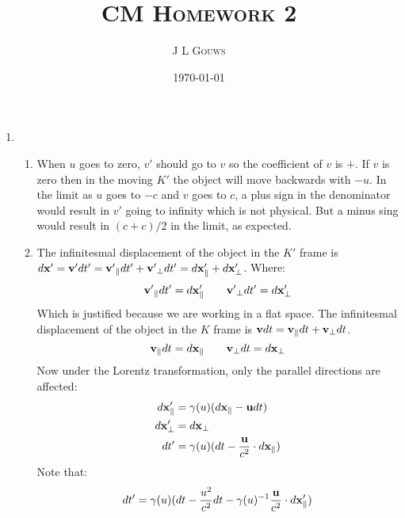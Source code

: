 \documentclass[12pt,a4]{article}
\title{
\textsc{CM Homework 2}
}
\author{\textsc{J L Gouws}
}
\date{\today
\\[1cm]}
\begin{document}
\thispagestyle{empty}

\maketitle

\begin{enumerate}
  \item
    \begin{enumerate}
      \item 
        When $u$ goes to zero, $v'$ should go to $v$ so the coefficient of $v$ is $+$.
        If $v$ is zero then in the moving $K'$ the object will move backwards with $-u$.
        In the limit as $u$ goes to $-c$ and $v$ goes to $c$, a plus sign in the denominator would result in $v'$ going to infinity which is not physical.
        But a minus sing would result in $(c + c) / 2$ in the limit, as expected.
      \item
        The infinitesmal displacement of the object in the $K'$ frame is $d{\bf x'} = {\bf v'}dt' = {\bf v'}_{\parallel} dt' + {\bf v'}_{\perp}dt' = d {\bf x}'_\parallel + d {\bf x}'_\perp$. Where:
        \begin{equation*}
          {\bf v'}_{\parallel} dt' = d {\bf x}'_\parallel \qquad {\bf v'}_{\perp}dt' = d {\bf x}'_\perp
        \end{equation*}
        Which is justified because we are working in a flat space.
        The infinitesmal displacement of the object in the $K$ frame is ${\bf v}dt = {\bf v}_{\parallel} dt + {\bf v}_{\perp}dt$.
        \begin{equation*}
          {\bf v}_{\parallel} dt = d {\bf x}_\parallel \qquad {\bf v}_{\perp}dt = d {\bf x}_\perp
        \end{equation*}
        Now under the Lorentz transformation, only the parallel directions are affected:
        \begin{align}
          d {\bf x}'_\parallel &= \gamma (u) (d {\bf x}_\parallel - {\bf u} dt) \label{eq:x1}\\
          d {\bf x}'_\perp &= d {\bf x}_\perp \label{eq:x2}\\
          d t' &= \gamma (u) (d t - \frac{{\bf u}}{c^2} \cdot d{\bf x}_\parallel)   \label{eq:x3}
        \end{align}
        Note that:
        \begin{align}
          d t' &= \gamma(u) (dt - \frac{u^2}{c^2} dt - \gamma(u)^{-1}\frac{{\bf u}}{c^2} \cdot d {\bf x}'_\parallel) \nonumber\\

\end{align}
\end{enumerate}
\end{enumerate}
\end{document}
